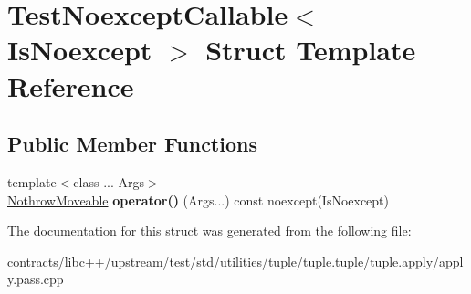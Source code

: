 \hypertarget{struct_test_noexcept_callable}{}\section{Test\+Noexcept\+Callable$<$ Is\+Noexcept $>$ Struct Template Reference}
\label{struct_test_noexcept_callable}
\subsection*{Public Member Functions}
\begin{DoxyCompactItemize}
\item 
\mbox{\label{struct_test_noexcept_callable_a3c661a8aac58c045e831ec7afeca0b37}} 
{\footnotesize template$<$class ... Args$>$ }\\\mbox{\hyperlink{struct_nothrow_moveable}{Nothrow\+Moveable}} {\bfseries operator()} (Args...) const noexcept(Is\+Noexcept)
\end{DoxyCompactItemize}


The documentation for this struct was generated from the following file\+:\begin{DoxyCompactItemize}
\item 
contracts/libc++/upstream/test/std/utilities/tuple/tuple.\+tuple/tuple.\+apply/apply.\+pass.\+cpp\end{DoxyCompactItemize}
